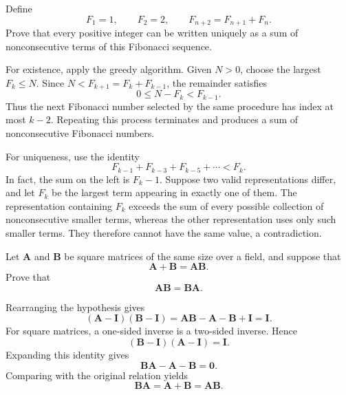     \begin{expectedproblem}
        Define
        \[
            F_1=1,
            \qquad
            F_2=2,
            \qquad
            F_{n+2}=F_{n+1}+F_n.
        \]
        Prove that every positive integer can be written uniquely as a sum of
        nonconsecutive terms of this Fibonacci sequence.
    \end{expectedproblem}

    \begin{solution}
        For existence, apply the greedy algorithm. Given $N>0$, choose the
        largest $F_k\leq N$. Since $N<F_{k+1}=F_k+F_{k-1}$, the remainder
        satisfies
        \[
            0\leq N-F_k<F_{k-1}.
        \]
        Thus the next Fibonacci number selected by the same procedure has index
        at most $k-2$. Repeating this process terminates and produces a sum of
        nonconsecutive Fibonacci numbers.

        For uniqueness, use the identity
        \[
            F_{k-1}+F_{k-3}+F_{k-5}+\cdots<F_k.
        \]
        In fact, the sum on the left is $F_k-1$. Suppose two valid
        representations differ, and let $F_k$ be the largest term appearing in
        exactly one of them. The representation containing $F_k$ exceeds the
        sum of every possible collection of nonconsecutive smaller terms,
        whereas the other representation uses only such smaller terms. They
        therefore cannot have the same value, a contradiction.
    \end{solution}

    \begin{expectedproblem}[1986 Putnam]
        Let $\mathbf{A}$ and $\mathbf{B}$ be square matrices of the same size
        over a field, and suppose that
        \[
            \mathbf{A}+\mathbf{B}=\mathbf{A}\mathbf{B}.
        \]
        Prove that
        \[
            \mathbf{A}\mathbf{B}=\mathbf{B}\mathbf{A}.
        \]
    \end{expectedproblem}

    \begin{solution}
        Rearranging the hypothesis gives
        \[
            (\mathbf{A}-\mathbf{I})(\mathbf{B}-\mathbf{I})
            =
            \mathbf{A}\mathbf{B}-\mathbf{A}-\mathbf{B}+\mathbf{I}
            =
            \mathbf{I}.
        \]
        For square matrices, a one-sided inverse is a two-sided inverse. Hence
        \[
            (\mathbf{B}-\mathbf{I})(\mathbf{A}-\mathbf{I})=\mathbf{I}.
        \]
        Expanding this identity gives
        \[
            \mathbf{B}\mathbf{A}-\mathbf{A}-\mathbf{B}=\mathbf{0}.
        \]
        Comparing with the original relation yields
        \[
            \mathbf{B}\mathbf{A}
            =
            \mathbf{A}+\mathbf{B}
            =
            \mathbf{A}\mathbf{B}.
        \]
    \end{solution}

